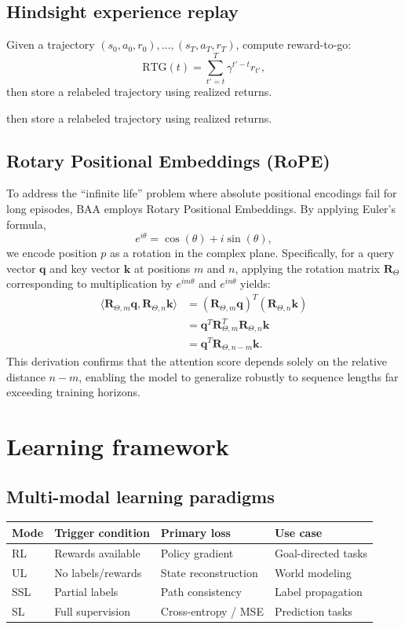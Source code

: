 \documentclass[11pt]{article}
\begin{document}
\subsection{Hindsight experience replay}
Given a trajectory $(s_0,a_0,r_0),\ldots,(s_T,a_T,r_T)$, compute reward-to-go:
\begin{equation}
\mathrm{RTG}(t)=\sum_{t'=t}^{T}\gamma^{t'-t} r_{t'},
\end{equation}
then store a relabeled trajectory using realized returns.

then store a relabeled trajectory using realized returns.

\subsection{Rotary Positional Embeddings (RoPE)}
To address the ``infinite life'' problem where absolute positional encodings fail for long episodes, BAA employs Rotary Positional Embeddings. By applying Euler's formula,
\begin{equation}
e^{i\theta} = \cos(\theta) + i\sin(\theta),
\end{equation}
we encode position $p$ as a rotation in the complex plane. Specifically, for a query vector $\mathbf{q}$ and key vector $\mathbf{k}$ at positions $m$ and $n$, applying the rotation matrix $\mathbf{R}_{\Theta}$ corresponding to multiplication by $e^{im\theta}$ and $e^{in\theta}$ yields:
\begin{align}
\langle \mathbf{R}_{\Theta,m}\mathbf{q}, \mathbf{R}_{\Theta,n}\mathbf{k} \rangle &= (\mathbf{R}_{\Theta,m}\mathbf{q})^T (\mathbf{R}_{\Theta,n}\mathbf{k}) \\
&= \mathbf{q}^T \mathbf{R}_{\Theta,m}^T \mathbf{R}_{\Theta,n} \mathbf{k} \\
&= \mathbf{q}^T \mathbf{R}_{\Theta,n-m} \mathbf{k}.
\end{align}
This derivation confirms that the attention score depends solely on the relative distance $n-m$, enabling the model to generalize robustly to sequence lengths far exceeding training horizons.

\section{Learning framework}\label{sec:learning}
\subsection{Multi-modal learning paradigms}
\begin{center}
\begin{tabular}{@{}llll@{}}
\toprule
Mode & Trigger condition & Primary loss & Use case\\
\midrule
RL & Rewards available & Policy gradient & Goal-directed tasks\\
UL & No labels/rewards & State reconstruction & World modeling\\
SSL & Partial labels & Path consistency & Label propagation\\
SL & Full supervision & Cross-entropy / MSE & Prediction tasks\\
\bottomrule
\end{tabular}
\end{center}
\end{document}
